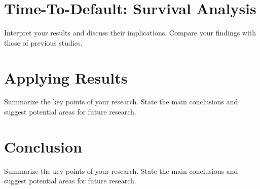 \documentclass[12pt]{article}
\begin{document}
\section{Time-To-Default: Survival Analysis}
Interpret your results and discuss their implications. Compare your findings with those of previous studies.

\section{Applying Results}
Summarize the key points of your research. State the main conclusions and suggest potential areas for future research.

\section{Conclusion}
Summarize the key points of your research. State the main conclusions and suggest potential areas for future research.

\printbibliography
\end{document}
